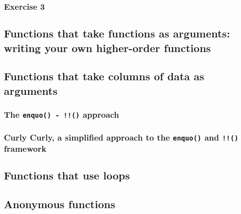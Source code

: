 \documentclass[]{gitbook}
\begin{document}
\hypertarget{exercise-3-1}{%
\subsubsection*{Exercise 3}\label{exercise-3-1}}

\hypertarget{functions-that-take-functions-as-arguments-writing-your-own-higher-order-functions}{%
\subsection{Functions that take functions as arguments: writing your own higher-order functions}\label{functions-that-take-functions-as-arguments-writing-your-own-higher-order-functions}}

\hypertarget{functions-that-take-columns-of-data-as-arguments}{%
\subsection{Functions that take columns of data as arguments}\label{functions-that-take-columns-of-data-as-arguments}}

\hypertarget{the-enquo---approach}{%
\subsubsection{\texorpdfstring{The \texttt{enquo()\ -\ !!()} approach}{The enquo() - !!() approach}}\label{the-enquo---approach}}

\hypertarget{curly-curly-a-simplified-approach-to-the-enquo-and-framework}{%
\subsubsection{\texorpdfstring{Curly Curly, a simplified approach to the \texttt{enquo()} and \texttt{!!()} framework}{Curly Curly, a simplified approach to the enquo() and !!() framework}}\label{curly-curly-a-simplified-approach-to-the-enquo-and-framework}}

\hypertarget{functions-that-use-loops}{%
\subsection{Functions that use loops}\label{functions-that-use-loops}}

\hypertarget{anonymous-functions}{%
\subsection{Anonymous functions}\label{anonymous-functions}}
\end{document}
